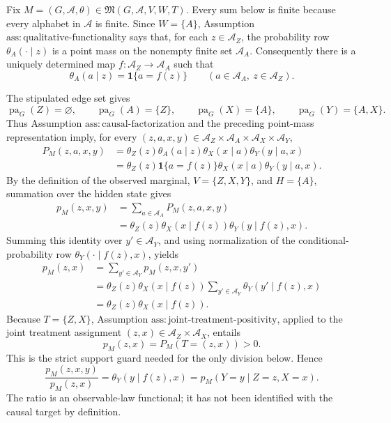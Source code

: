 Fix \(M=(G,\mathcal A,\theta)\in\mathfrak M(G,\mathcal A,V,W,T)\).  Every sum below is finite because every alphabet in \(\mathcal A\) is finite.  Since \(W=\{A\}\), Assumption \(\mathrm{ass:qualitative\text{-}functionality}\) says that, for each \(z\in\mathcal A_Z\), the probability row \(\theta_A(\cdot\mid z)\) is a point mass on the nonempty finite set \(\mathcal A_A\).  Consequently there is a uniquely determined map \(f:\mathcal A_Z\to\mathcal A_A\) such that
\[
 \theta_A(a\mid z)=\mathbf 1\{a=f(z)\}
 \qquad
 (a\in\mathcal A_A,\ z\in\mathcal A_Z).
\]

The stipulated edge set gives
\[
 \operatorname{pa}_G(Z)=\varnothing,
 \qquad
 \operatorname{pa}_G(A)=\{Z\},
 \qquad
 \operatorname{pa}_G(X)=\{A\},
 \qquad
 \operatorname{pa}_G(Y)=\{A,X\}.
\]
Thus Assumption \(\mathrm{ass:causal\text{-}factorization}\) and the preceding point-mass representation imply, for every \((z,a,x,y)\in\mathcal A_Z\times\mathcal A_A\times\mathcal A_X\times\mathcal A_Y\),
\[
\begin{aligned}
 P_M(z,a,x,y)
 &=\theta_Z(z)\theta_A(a\mid z)\theta_X(x\mid a)\theta_Y(y\mid a,x)\\
 &=\theta_Z(z)\mathbf 1\{a=f(z)\}\theta_X(x\mid a)\theta_Y(y\mid a,x).
\end{aligned}
\]
By the definition of the observed marginal, \(V=\{Z,X,Y\}\), and \(H=\{A\}\), summation over the hidden state gives
\[
\begin{aligned}
 p_M(z,x,y)
 &=\sum_{a\in\mathcal A_A}P_M(z,a,x,y)\\
 &=\theta_Z(z)\theta_X(x\mid f(z))\theta_Y(y\mid f(z),x).
\end{aligned}
\]
Summing this identity over \(y'\in\mathcal A_Y\), and using normalization of the conditional-probability row \(\theta_Y(\cdot\mid f(z),x)\), yields
\[
\begin{aligned}
 p_M(z,x)
 &=\sum_{y'\in\mathcal A_Y}p_M(z,x,y')\\
 &=\theta_Z(z)\theta_X(x\mid f(z))
   \sum_{y'\in\mathcal A_Y}\theta_Y(y'\mid f(z),x)\\
 &=\theta_Z(z)\theta_X(x\mid f(z)).
\end{aligned}
\]
Because \(T=\{Z,X\}\), Assumption \(\mathrm{ass:joint\text{-}treatment\text{-}positivity}\), applied to the joint treatment assignment \((z,x)\in\mathcal A_Z\times\mathcal A_X\), entails
\[
 p_M(z,x)=P_M(T=(z,x))>0.
\]
This is the strict support guard needed for the only division below.  Hence
\[
 \frac{p_M(z,x,y)}{p_M(z,x)}
 =\theta_Y(y\mid f(z),x)
 =p_M(Y=y\mid Z=z,X=x).
\]
The ratio is an observable-law functional; it has not been identified with the causal target by definition.

